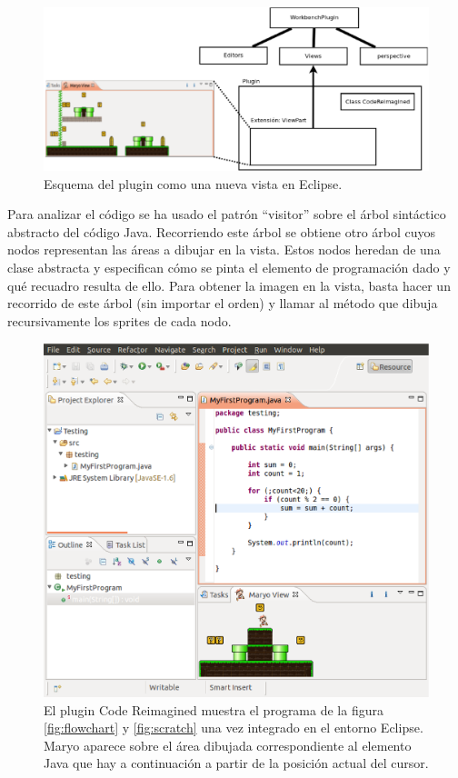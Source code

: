 \documentclass{llncs}
\begin{document}
\begin{figure}[ht]
\begin{center}
\includegraphics[scale=0.3]{images/crplugin.eps}
\caption{Esquema del plugin como una nueva vista en Eclipse.
\label{fig:crplugin}}
\end{center}
\end{figure}

Para analizar el código se ha usado el patrón ``visitor'' sobre el árbol sintáctico abstracto del código Java. Recorriendo este árbol se obtiene otro árbol cuyos nodos representan las áreas a dibujar en la vista. Estos nodos heredan de una clase abstracta y especifican cómo se pinta el elemento de programación dado y qué recuadro resulta de ello. Para obtener la imagen en la vista, basta hacer un recorrido de este árbol (sin importar el orden) y llamar al método que dibuja recursivamente los sprites de cada nodo. 

\begin{figure}[ht]
\begin{center}
\includegraphics[scale=0.4]{images/eclipse.eps}
\caption{El plugin Code Reimagined muestra el programa de la figura \ref{fig:flowchart} y \ref{fig:scratch} una vez integrado en el entorno Eclipse. Maryo aparece sobre el área dibujada correspondiente al elemento Java que hay a continuación a partir de la posición actual del cursor.
\label{fig:eclipse}}
\end{center}
\end{figure}
\end{document}

